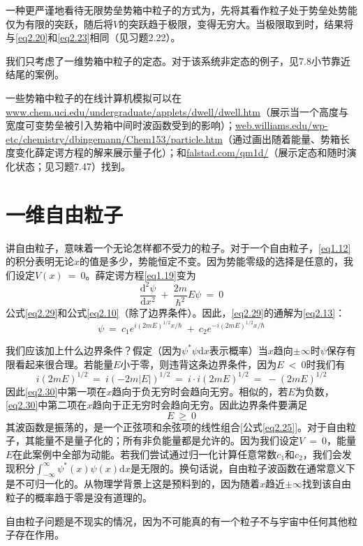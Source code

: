 \documentclass[12pt,a4paper,openany]{ctexbook}
\begin{document}
\begin{flushleft}
一种更严谨地看待无限势垒势箱中粒子的方式为，先将其看作粒子处于势垒处势能仅为有限的突跃，随后将$V$的突跃趋于极限，变得无穷大。当极限取到时，结果将与\eqref{eq2.20}和\eqref{eq2.23}相同（见习题2.22）。

我们只考虑了一维势箱中粒子的定态。对于该系统非定态的例子，见7.8小节靠近结尾的案例。

一些势箱中粒子的在线计算机模拟可以在\url{www.chem.uci.edu/undergraduate/applets/dwell/dwell.htm}（展示当一个高度与宽度可变势垒被引入势箱中间时波函数受到的影响）；\url{web.williams.edu/wp-etc/chemistry/dbingemann/Chem153/particle.htm}（通过画出随着能量、势箱长度变化薛定谔方程的解来展示量子化）；和\url{falstad.com/qm1d/}（展示定态和随时演化状态；见习题7.47）找到。
\end{flushleft}
\section{一维自由粒子}
\begin{flushleft}
    \setlength{\parindent}{2em}
讲自由粒子，意味着一个无论怎样都不受力的粒子。对于一个自由粒子，\eqref{eq1.12}的积分表明无论$x$的值是多少，势能恒定不变。因为势能零级的选择是任意的，我们设定$V(x)\ =\ 0$。薛定谔方程\eqref{eq1.19}变为
\begin{equation}
    \frac{\mathrm{d}^2\psi}{\mathrm{d}x^2}\ +\ \frac{2m}{\hbar^2}E\psi\ =\ 0
    \label{eq2.29}
\end{equation}
公式\eqref{eq2.29}和公式\eqref{eq2.10}（除了边界条件）。因此，\eqref{eq2.29}的通解为\eqref{eq2.13}：
\begin{equation}
    \psi\ =\ c_1e^{i(2mE)^{1/2}x/\hbar}\ +\ c_2e^{-i(2mE)^{1/2}x/\hbar}
    \label{eq2.30}
\end{equation}

我们应该加上什么边界条件？假定（因为$\psi^*\psi\mathrm{d}x$表示概率）当$x$趋向$\pm\infty$时$\psi$保存有限看起来很合理。若能量$E$小于零，则违背这条边界条件，因为$E\ <\ 0$时我们有
\begin{equation*}
    i(2mE)^{1/2}\ =\ i(-2m\left|E\right|)^{1/2}\ =\ i\cdot i(2mE)^{1/2}\ =\ -(2mE)^{1/2}
\end{equation*}
因此\eqref{eq2.30}中第一项在$x$趋向于负无穷时会趋向无穷。相似的，若$E$为负数，\eqref{eq2.30}中第二项在$x$趋向于正无穷时会趋向无穷。因此边界条件要满足
\begin{equation}
    E\ \geq\ 0
\end{equation}
其波函数是振荡的，是一个正弦项和余弦项的线性组合[公式\eqref{eq2.25}]。对于自由粒子，其能量不是量子化的；所有非负能量都是允许的。因为我们设定$V\ =\ 0$，能量$E$在此案例中全部为动能。若我们尝试通过归一化计算任意常数$c_1$和$c_2$，我们会发现积分$\int_{-\infty}^{\infty}\psi^*(x)\psi(x)\mathrm{d}x$是无限的。换句话说，自由粒子波函数在通常意义下是不可归一化的。从物理学背景上这是预料到的，因为随着$x$趋近$\pm\infty$找到该自由粒子的概率趋于零是没有道理的。

自由粒子问题是不现实的情况，因为不可能真的有一个粒子不与宇宙中任何其他粒子存在作用。
\end{flushleft}
\end{document}
